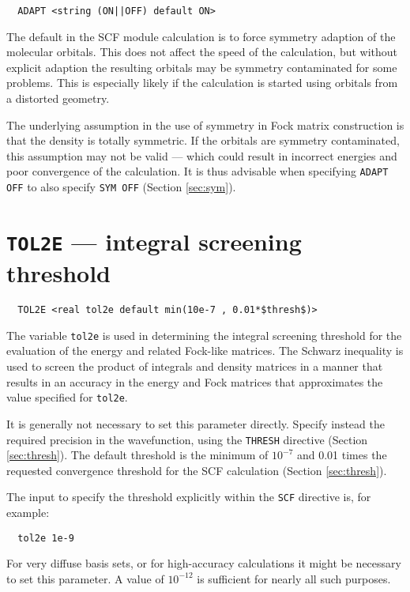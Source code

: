 \begin{verbatim}
  ADAPT <string (ON||OFF) default ON>
\end{verbatim}

The default in the SCF module calculation is to force symmetry
adaption of the molecular orbitals. This does not affect the speed of
the calculation, but without explicit adaption the resulting orbitals
may be symmetry contaminated for some problems.  This is especially
likely if the calculation is started using orbitals from a distorted
geometry.

The underlying assumption in the use of symmetry in Fock matrix
construction is that the density is totally symmetric.  If the orbitals
are symmetry contaminated, this assumption may not be valid --- which
could result in incorrect energies and poor convergence of the
calculation.  It is thus advisable when specifying \verb+ADAPT OFF+ to
also specify \verb+SYM OFF+ (Section \ref{sec:sym}).

\section{{\tt TOL2E} --- integral screening threshold}
\label{sec:tol2e}

\begin{verbatim}
  TOL2E <real tol2e default min(10e-7 , 0.01*$thresh$)>
\end{verbatim}

The variable \verb+tol2e+ is used in determining the integral
screening threshold for the evaluation of the energy and related
Fock-like matrices.  The Schwarz inequality is used to screen the
product of integrals and density matrices in a manner that results in
an accuracy in the energy and Fock matrices that approximates the
value specified for \verb+tol2e+. 

It is generally not necessary to set this parameter directly.  Specify
instead the required precision in the wavefunction, using the
\verb+THRESH+ directive (Section \ref{sec:thresh}). The default
threshold is the minimum of $10^{-7}$ and 0.01 times the requested
convergence threshold for the SCF calculation (Section
\ref{sec:thresh}).  

The input to specify the threshold explicitly within the \verb+SCF+
directive is, for example:

\begin{verbatim}
  tol2e 1e-9
\end{verbatim}

For very diffuse basis sets, or for high-accuracy calculations it
might be necessary to set this parameter.  A value of $10^{-12}$ is
sufficient for nearly all such purposes.


